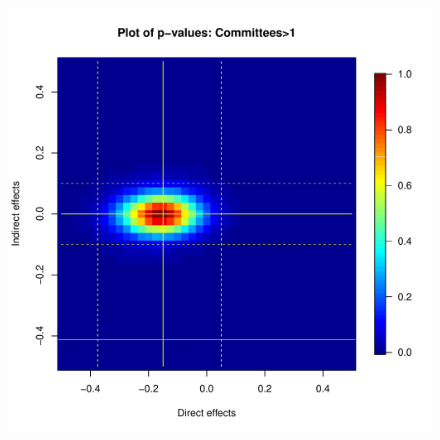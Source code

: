 \documentclass{beamer}
\begin{document}
\begin{frame}
\begin{columns}[c]
\begin{figure}
\centering
\includegraphics[trim = 11mm 0mm 9mm 0mm, clip, scale=0.39]{pval_plot_coppock_committee_2ormore.pdf}
\end{figure}

\end{columns}
\end{frame}
\end{document}
